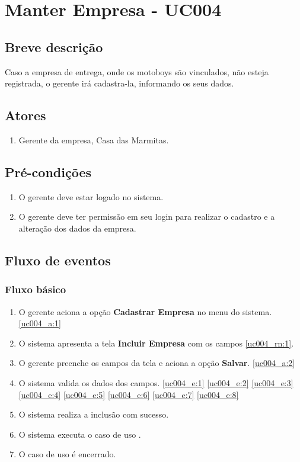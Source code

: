 \chapter{Manter Empresa - UC004} \label{uc004}

\section{Breve descrição}

Caso a empresa de entrega, onde os motoboys são vinculados, não esteja registrada, o gerente irá cadastra-la, informando os seus dados.

\section{Atores}

\begin{enumerate}
	\item Gerente da empresa, Casa das Marmitas.
\end{enumerate}

\section{Pré-condições}

\begin{enumerate}
	\item O gerente deve estar logado no sistema.
	\item O gerente deve ter permissão em seu login para realizar o cadastro e a alteração dos dados da empresa.
\end{enumerate}

\section{Fluxo de eventos}

\subsection{Fluxo básico}

\begin{enumerate}[label=P\arabic*]
	\item O gerente aciona a opção \textbf{Cadastrar Empresa} no menu do sistema. \ref{uc004_a:1}
	\item O sistema apresenta a tela \textbf{Incluir Empresa} com os campos \ref{uc004_rn:1}. \label{uc004_p:2}
	\item O gerente preenche os campos da tela e aciona a opção \textbf{Salvar}. \label{uc004_p:3} \ref{uc004_a:2}
	\item O sistema valida os dados dos campos. \ref{uc004_e:1} \ref{uc004_e:2} \ref{uc004_e:3} \ref{uc004_e:4} \ref{uc004_e:5} \ref{uc004_e:6} \ref{uc004_e:7} \ref{uc004_e:8}
	\item O sistema realiza a inclusão com sucesso.
	\item O sistema executa o caso de uso .
	\item O caso de uso é encerrado.	
\end{enumerate}

